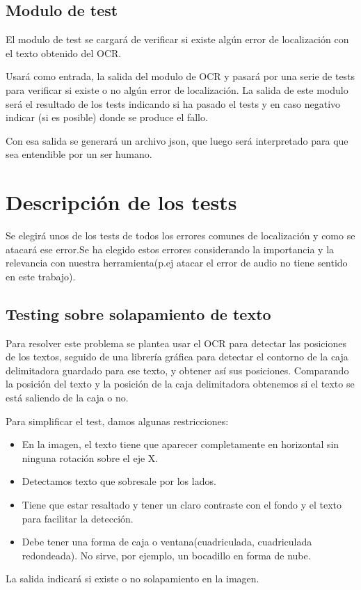 \subsection{Modulo de test}
El modulo de test se cargará de verificar si existe algún error de localización con el texto obtenido del OCR.

Usará como entrada, la salida del modulo de OCR y pasará por una serie de tests para verificar si existe o no algún error de localización. La salida de este modulo será el resultado de los tests indicando si ha pasado el tests y en caso negativo indicar (si es posible) donde se produce el fallo.

Con esa salida se generará un archivo json, que luego será interpretado para que sea entendible por un ser humano.
\section{Descripción de los tests}
\label{sec:Descripción de los tests}

Se elegirá unos de los tests de todos los errores comunes de localización y como se atacará ese error.Se ha elegido estos errores considerando la importancia y la relevancia con nuestra herramienta(p.ej atacar el error de audio no tiene sentido en este trabajo).

\subsection{Testing sobre solapamiento de texto }
Para resolver este problema se plantea usar el OCR para detectar las posiciones de los textos, seguido de una librería gráfica para detectar el contorno de la caja delimitadora guardado para ese texto, y obtener así sus posiciones. Comparando la posición del texto y la posición de la caja delimitadora obtenemos si el texto se está saliendo de la caja o no.

Para simplificar el test, damos algunas restricciones: 
\begin{itemize}
	\item En la imagen, el texto tiene que aparecer completamente en horizontal sin ninguna rotación sobre el eje X.
	\item Detectamos texto que sobresale por los lados.
	\item Tiene que estar resaltado y tener un claro contraste con el fondo y el texto para facilitar la detección.
	\item Debe tener una forma de caja o ventana(cuadriculada, cuadriculada redondeada). No sirve, por ejemplo, un bocadillo en forma de nube.
\end{itemize} 
La salida indicará si existe o no solapamiento en la imagen.

